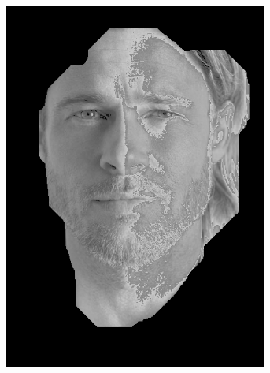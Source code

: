 \begin{figure}[H]
\begin{subfigure}{.16\textwidth}
  \includegraphics[width=0.95\textwidth]{img/fd3/grayFaceSpecial.png}
  \caption{}
\end{subfigure}%
\begin{subfigure}{.16\textwidth}
  \centering

\end{subfigure}
\end{figure}
